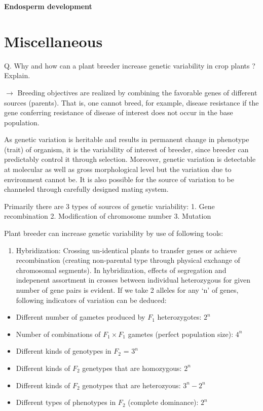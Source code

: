 \documentclass[
  openany]{book}
\providecommand{\tightlist}{%
  \setlength{\itemsep}{0pt}\setlength{\parskip}{0pt}}
\begin{document}
\textbf{Endosperm development}

\hypertarget{miscellaneous}{%
\section{Miscellaneous}\label{miscellaneous}}

Q. Why and how can a plant breeder increase genetic variability in crop plants ? Explain.

\(\longrightarrow\) Breeding objectives are realized by combining the favorable genes of different sources (parents). That is, one cannot breed, for example, disease resistance if the gene conferring resistance of disease of interest does not occur in the base population.

As genetic variation is heritable and results in permanent change in phenotype (trait) of organism, it is the variability of interest of breeder, since breeder can predictably control it through selection. Moreover, genetic variation is detectable at molecular as well as gross morphological level but the variation due to environment cannot be. It is also possible for the source of variation to be channeled through carefully designed mating system.

Primarily there are 3 types of sources of genetic variability:
1. Gene recombination
2. Modification of chromosome number
3. Mutation

Plant breeder can increase genetic variability by use of following tools:

\begin{enumerate}
\def\labelenumi{\arabic{enumi}.}
\tightlist
\item
  Hybridization: Crossing un-identical plants to transfer genes or achieve recombination (creating non-parental type through physical exchange of chromosomal segments). In hybridization, effects of segregation and indepenent assortment in crosses between individual heterozygous for given number of gene pairs is evident. If we take 2 alleles for any `n' of genes, following indicators of variation can be deduced:
\end{enumerate}

\begin{itemize}
\tightlist
\item
  Different number of gametes produced by \(F_1\) heterozygotes: \(2^n\)
\item
  Number of combinations of \(F_1 \times F_1\) gametes (perfect population size): \(4^n\)
\item
  Different kinds of genotypes in \(F_2\) = \(3^n\)
\item
  Different kinds of \(F_2\) genetypes that are homozygous: \(2^n\)
\item
  Different kinds of \(F_2\) genotypes that are heterozyous: \(3^n-2^n\)
\item
  Different types of phenotypes in \(F_2\) (complete dominance): \(2^n\)
\end{itemize}
\end{document}
